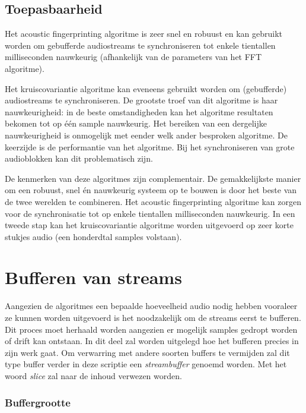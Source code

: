 \subsection{Toepasbaarheid}
\label{toepasbaarheid}

Het acoustic fingerprinting algoritme is zeer snel en robuust en kan gebruikt worden om gebufferde audiostreams te synchroniseren tot enkele tientallen milliseconden nauwkeurig (afhankelijk van de parameters van het FFT algoritme).

Het kruiscovariantie algoritme kan eveneens gebruikt worden om (gebufferde) audiostreams te synchroniseren. De grootste troef van dit algoritme is haar nauwkeurigheid: in de beste omstandigheden kan het algoritme resultaten bekomen tot op één sample nauwkeurig. Het bereiken van een dergelijke nauwkeurigheid is onmogelijk met eender welk ander besproken algoritme. De keerzijde is de performantie van het algoritme. Bij het synchroniseren van grote audioblokken kan dit problematisch zijn.

De kenmerken van deze algoritmes zijn complementair. De gemakkelijkste manier om een robuust, snel én nauwkeurig systeem op te bouwen is door het beste van de twee werelden te combineren. Het acoustic fingerprinting algoritme kan zorgen voor de synchronisatie tot op enkele tientallen milliseconden nauwkeurig. In een tweede stap kan het kruiscovariantie algoritme worden uitgevoerd op zeer korte stukjes audio (een honderdtal samples volstaan).

\section{Bufferen van streams}
\label{streambuffers}

Aangezien de algoritmes een bepaalde hoeveelheid audio nodig hebben vooraleer ze kunnen worden uitgevoerd is het noodzakelijk om de streams eerst te bufferen. Dit proces moet herhaald worden aangezien er mogelijk samples gedropt worden of drift kan ontstaan. In dit deel zal worden uitgelegd hoe het bufferen precies in zijn werk gaat. Om verwarring met andere soorten buffers te vermijden zal dit type buffer verder in deze scriptie een \textit{streambuffer} genoemd worden. Met het woord \textit{slice} zal naar de inhoud verwezen worden.

\subsubsection{Buffergrootte}

